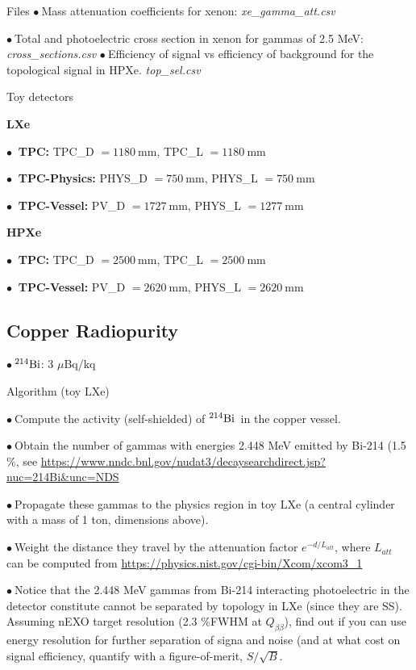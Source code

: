 \documentclass [aspectratio=169]{beamer}
\newcommand{\qbb}{\ensuremath{Q_{\beta\beta}}}
\newcommand{\BI}{\ensuremath{{}^{214}{\rm Bi}}}
\begin{document}
\begin{frame}{Files}
$\bullet~$Mass attenuation coefficients for xenon: {\em xe\_gamma\_att.csv}

$\bullet~$Total and photoelectric cross section in xenon for gammas of 2.5 MeV: {\em cross\_sections.csv}
%
$\bullet~$Efficiency of signal vs efficiency of background for the topological signal in HPXe. {\em top\_sel.csv}
\end{frame}


\begin{frame}{Toy detectors}

{\bf \large LXe}
\vspace{3mm}

$\bullet~$ {\bf TPC:} TPC\_D $=1180~$mm, TPC\_L $=1180~$mm

$\bullet~$ {\bf TPC-Physics:} PHYS\_D $=750~$mm, PHYS\_L $=750~$mm

$\bullet~$ {\bf TPC-Vessel:} PV\_D $=1727~$mm, PHYS\_L $=1277~$mm

\vspace{3mm}

{\bf \large HPXe}
\vspace{3mm}

$\bullet~$ {\bf TPC:} TPC\_D $=2500~$mm, TPC\_L $=2500~$mm

$\bullet~$ {\bf TPC-Vessel:} PV\_D $=2620~$mm, PHYS\_L $=2620~$mm

\subsection{Copper Radiopurity}
$\bullet~$\BI: 3 $\mu$Bq/kq
\end{frame}

\begin{frame}{Algorithm (toy LXe)}

$\bullet~$Compute the activity (self-shielded) of \BI\ in the copper vessel.

$\bullet~$Obtain the number of gammas with energies 2.448 MeV emitted by Bi-214 (1.5 \%, see \url{https://www.nndc.bnl.gov/nudat3/decaysearchdirect.jsp?nuc=214Bi\&unc=NDS}

$\bullet~$Propagate these gammas to the physics region in toy LXe (a central cylinder with a mass of 1 ton, dimensions above).

$\bullet~$Weight the distance they travel by the attenuation factor $e^{-d/L_{att}}$, where $L_{att}$ can be computed from  \url{https://physics.nist.gov/cgi-bin/Xcom/xcom3_1}

$\bullet~$Notice that the 2.448 MeV gammas from Bi-214  interacting photoelectric in the detector constitute cannot be separated by topology in LXe (since they are SS). Assuming nEXO target resolution (2.3 \%FWHM at \qbb), find out if you can use energy resolution for further separation of signa and noise (and at what cost on signal efficiency, quantify with a figure-of-merit, $S/\sqrt{B}$.
\end{frame}
\end{document}
